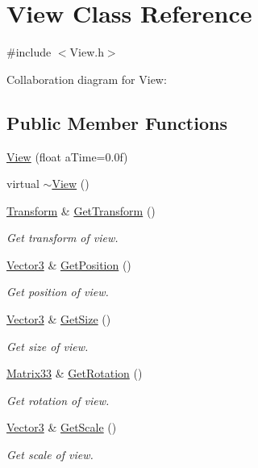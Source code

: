 \hypertarget{classView}{}\section{View Class Reference}
\label{classView}


{\ttfamily \#include $<$View.\+h$>$}



Collaboration diagram for View\+:
\subsection*{Public Member Functions}
\begin{DoxyCompactItemize}
\item 
\hyperlink{classView_a68bebba994b428bae3bcf2327687dd25}{View} (float a\+Time=0.\+0f)
\item 
virtual \hyperlink{classView_ad0dc854db9aabbea98a334dec89f785c}{$\sim$\+View} ()
\item 
\hyperlink{classTransform}{Transform} \& \hyperlink{classView_afda848b1506718346d0ed8ec20d2d3a7}{Get\+Transform} ()
\begin{DoxyCompactList}\small\item\em Get transform of view. \end{DoxyCompactList}\item 
\hyperlink{structVector3}{Vector3} \& \hyperlink{classView_ab93f0dc7010f378841d3f621b38b9809}{Get\+Position} ()
\begin{DoxyCompactList}\small\item\em Get position of view. \end{DoxyCompactList}\item 
\hyperlink{structVector3}{Vector3} \& \hyperlink{classView_a613df09b5105deac34c1de42f75dbac6}{Get\+Size} ()
\begin{DoxyCompactList}\small\item\em Get size of view. \end{DoxyCompactList}\item 
\hyperlink{structMatrix33}{Matrix33} \& \hyperlink{classView_ace4ba80de1b29dfb5eb12720b2879f99}{Get\+Rotation} ()
\begin{DoxyCompactList}\small\item\em Get rotation of view. \end{DoxyCompactList}\item 
\hyperlink{structVector3}{Vector3} \& \hyperlink{classView_a585a51263a834f63f663e1a9ba40c5ef}{Get\+Scale} ()
\begin{DoxyCompactList}\small\item\em Get scale of view. \end{DoxyCompactList}\item 

\end{DoxyCompactItemize}
